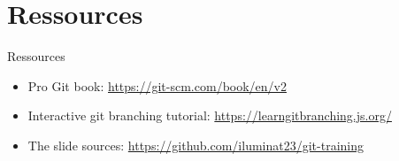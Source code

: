 \documentclass[aspectratio=169]{beamer}
\newcommand{\sectiontitle}{}
\newcommand{\newsection}[1]{\renewcommand{\sectiontitle}{#1}\section{#1}}
\begin{document}
\newsection{Ressources}
\begin{frame}{Ressources}
\begin{itemize}
    \item Pro Git book: \url{https://git-scm.com/book/en/v2}
    \item Interactive git branching tutorial: \url{https://learngitbranching.js.org/}
    \item The slide sources: \url{https://github.com/iluminat23/git-training}
\end{itemize}
\end{frame}
\end{document}
